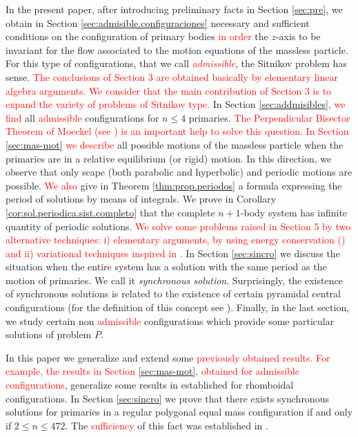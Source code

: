 \documentclass[smallcondensed]{svjour3}
\begin{document}
In the present paper, after introducing preliminary facts in Section \ref{sec:pre},   we
obtain in Section \ref{sec:admisible.configuraciones} necessary and sufficient conditions on the configuration of primary bodies \textcolor{red}{in order}  the $z$-axis to be invariant for the flow associated to the motion equations of the massless particle. For this type of configurations, that we call \emph{\textcolor{red}{admissible}}, the Sitnikov problem has sense. \textcolor{red}{The conclusions of Section 3 are obtained basically by elementary linear algebra arguments. We consider that the main contribution of Section 3 is to expand the variety of problems of Sitnikov type.}  In Section \ref{sec:addmisibles}, \textcolor{red}{we find} all \textcolor{red}{admissible} configurations for $n\leq 4$ primaries. \textcolor{red}{The Perpendicular Bisector Theorem of Moeckel (see \cite{moeckel1990central}) is an important help to solve this question.} \textcolor{red}{In Section \ref{sec:mas-mot} we describe} all possible motions of the massless particle when the
primaries are in a relative equilibrium (or rigid) motion.  In this direction, we observe that only scape (both parabolic and hyperbolic) and periodic motions are possible.  \textcolor{red}{We also } give in Theorem \ref{thm:prop.periodos} a formula expressing the period of solutions  by means of integrals.  We prove in Corollary \ref{cor:sol.periodica.sist.completo} that the complete $n+1$-body system has  infinite quantity of periodic solutions. \textcolor{red}{We solve some problems raised in Section 5 by two alternative techniques: i) elementary arguments, by using energy conservation (\cite[Ch. 2]{A}) and ii) variational techniques inspired in \cite{li2013characterization,David-2004,zhao2015nonplanar}.} In Section  \ref{sec:sincro} we
discuss the
situation when the entire system has a solution with the same period as the motion of primaries. We call it \emph{synchronous solution}. Surprisingly, the existence of synchronous solutions is related to the existence of certain pyramidal central configurations (for the definition of this concept see \cite{fayccal1996classification,faycaltesis,ouyang2004pyramidal}). Finally, in the last section, we study certain non \textcolor{red}{admissible} configurations which provide some particular solutions of problem $P$.

In this paper we generalize and extend some \textcolor{red}{previously  obtained results. For example, the results in Section \ref{sec:mas-mot}, obtained for  admissible configurations},  generalize some results  in \cite{marchesin2013spatial} established for rhomboidal configurations. In Section \ref{sec:sincro} we prove that there exists synchronous solutions for primaries in a regular polygonal equal mass configuration if and only if $2\leq n\leq 472$. The \textcolor{red}{sufficiency} of this fact was established in \cite{li2013characterization}.
\end{document}
